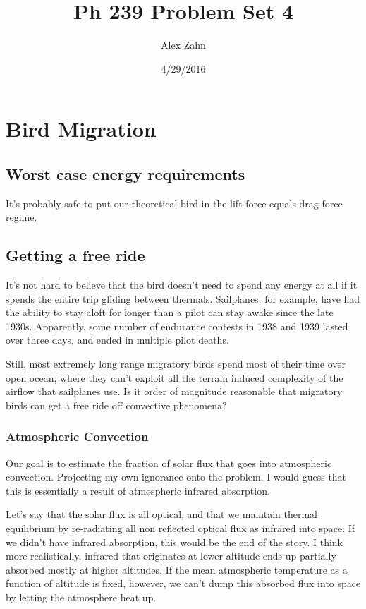 \documentclass[12pt]{article}
\title{Ph 239 Problem Set 4}
\author{Alex Zahn}
\date{4/29/2016}
\begin{document}
\maketitle

\newcommand{\wmsq}{W/\(\mathrm{m}^2\,\)}
\newcommand{\msq}{\(\mathrm{m}^2\,\)}
\newcommand{\micron}{\(\mu\mathrm{m}\)\,}
\newcommand{\mcb}{\(\mathrm{m}^3\,\)}

\section{Bird Migration}

\subsection{Worst case energy requirements}

It's probably safe to put our theoretical bird in the lift force equals drag force regime. 

\subsection{Getting a free ride}

It's not hard to believe that the bird doesn't need to spend any energy at all if it spends the entire trip gliding between thermals. Sailplanes, for example, have had the ability to stay aloft for longer than a pilot can stay awake since the late 1930s. Apparently, some number of endurance contests in 1938 and 1939 lasted over three days, and ended in multiple pilot deaths.

Still, most extremely long range migratory birds spend most of their time over open ocean, where they can't exploit all the terrain induced complexity of the airflow that sailplanes use. Is it order of magnitude reasonable that migratory birds can get a free ride off convective phenomena?

\subsubsection{Atmospheric Convection}

Our goal is to estimate the fraction of solar flux that goes into atmospheric convection. Projecting my own ignorance onto the problem, I would guess that this is essentially a result of atmospheric infrared absorption.

Let's say that the solar flux is all optical, and that we maintain thermal equilibrium by re-radiating all non reflected optical flux as infrared into space. If we didn't have infrared absorption, this would be the end of the story. I think more realistically, infrared that originates at lower altitude ends up partially absorbed mostly at higher altitudes. If the mean atmospheric temperature as a function of altitude is fixed, however, we can't dump this absorbed flux into space by letting the atmosphere heat up.
\end{document}
